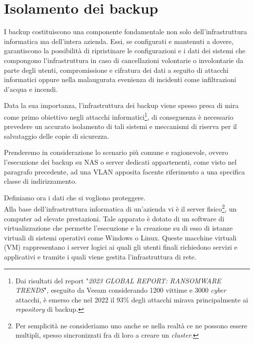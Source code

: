 \documentclass[target=bach,aauheader=]{thud}
\begin{document}
\section{Isolamento dei backup}
I backup costituiscono una componente fondamentale non solo dell'infrastruttura informatica ma dell'intera azienda. Essi, se configurati e mantenuti a dovere, garantiscono la possibilità di ripristinare le configurazioni e i dati dei sistemi che compongono l'infrastruttura in caso di cancellazioni volontarie o involontarie da parte degli utenti, compromissione e cifratura dei dati a seguito di attacchi informatici oppure nella malaugurata evenienza di incidenti come infiltrazioni d'acqua e incendi.

Data la sua importanza, l'infrastruttura dei backup viene spesso presa di mira come primo obiettivo negli attacchi informatici\footnote{Dai risultati del report "\textit{2023 GLOBAL REPORT: 
RANSOMWARE TRENDS}", eseguito da Veeam considerando 1200 vittime e 3000 \textit{cyber} attacchi, è emerso che nel 2022 il 93\% degli attacchi mirava principalmente ai \textit{repository} di backup.}, di conseguenza è necessario prevedere un accurato isolamento di tali sistemi e meccanismi di riserva per il salvataggio delle copie di sicurezza.

Prenderemo in considerazione lo scenario più comune e ragionevole, ovvero l'esecuzione dei backup su NAS o server dedicati appartenenti, come visto nel paragrafo precedente, ad una VLAN apposita facente riferimento a una specifica classe di indirizzamento.

Definiamo ora i dati che si vogliono proteggere.
\\ Alla base dell'infrastruttura informatica di un'azienda vi è il server fisico\footnote{Per semplicità ne consideriamo uno anche se nella realtà ce ne possono essere multipli, spesso sincronizzati fra di loro a creare un \textit{cluster}.}, un computer ad elevate prestazioni. Tale apparato è dotato di un software di virtualizzazione che permette l'esecuzione e la creazione su di esso di istanze virtuali di sistemi operativi come Windows o Linux. Queste macchine virtuali (VM) rappresentano i server logici ai quali gli utenti finali richiedono servizi e applicativi e tramite i quali viene gestita l'infrastruttura di rete.
\end{document}
